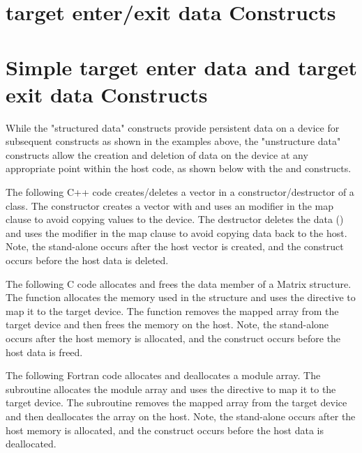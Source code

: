 \pagebreak
\section{target enter/exit data Constructs}
\label{sec:target_enter_exit_data}
\section{Simple target enter data and target exit data Constructs}
While the "structured data" constructs provide persistent data on a 
device for subsequent  constructs as shown in the 
 examples above, the "unstructure data" constructs 
allow the creation and deletion of data on the device at any appropriate
point within the host code, as shown below with the  
and  constructs.

The following C++ code creates/deletes a vector in a constructor/destructor 
of a class. The constructor creates a vector with 
and uses an  modifier in the map clause to avoid copying values
to the device. The destructor deletes the data ()
and uses the  modifier in the map clause to avoid copying data
back to the host. Note, the stand-alone  occurs 
after the host vector is created, and the 
construct occurs before the host data is deleted.

The following C code allocates and frees the data member of a Matrix structure.
The  function allocates the memory used in the structure and
uses the  directive to map it to the target device. The
 function removes the mapped array from the target device
and then frees the memory on the host.  Note, the stand-alone  occurs after the host memory is allocated, and the  construct occurs before the host data is freed.

The following Fortran code allocates and deallocates a module array.  The
 subroutine allocates the module array and uses the
 directive to map it to the target device. The
 subroutine removes the mapped array from the target device and
then deallocates the array on the host.  Note, the stand-alone  occurs after the host memory is allocated, and the  construct occurs before the host data is deallocated.

